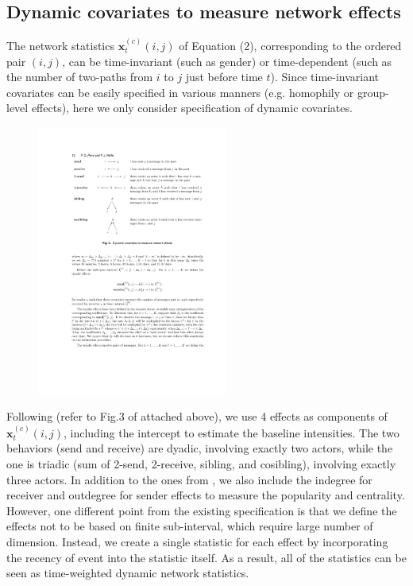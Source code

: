 \documentclass[a4paper]{article}
\begin{document}
\subsection{Dynamic covariates to measure network effects}
The network statistics $\boldsymbol{x}^{(c)}_t(i, j)$ of Equation (2), corresponding to the ordered pair $(i, j)$, can be time-invariant (such as gender) or time-dependent (such as the number of two-paths from $i$ to $j$ just before time $t$). Since time-invariant covariates can be easily specified in various manners (e.g. homophily or group-level effects), here we only consider specification of dynamic covariates.
\begin{figure}[ht]
	\centering
	\includegraphics[width=0.56\textwidth]{PerryWolfe.pdf} 
	\label{fig:PerryWolfeplot}
\end{figure}
\newline Following \cite{PerryWolfe2012} (refer to Fig.3 of \cite{PerryWolfe2012} attached above), we use 4 effects as components of $\boldsymbol{x}^{(c)}_t(i, j)$, including the intercept to estimate the baseline intensities. The two behaviors (send and receive) are dyadic, involving exactly two actors,
while the one is triadic (sum of 2-send, 2-receive, sibling, and cosibling), involving exactly three actors. In addition to the ones from \cite{PerryWolfe2012}, we also include the indegree for receiver and outdegree for sender effects to measure the popularity and centrality. However, one different point from the existing specification is that we define the effects not to be based on finite sub-interval, which require large number of dimension. Instead, we create a single statistic for each effect by incorporating the recency of event into the statistic itself. As a result, all of the statistics can be seen as time-weighted dynamic network statistics.
\end{document}
